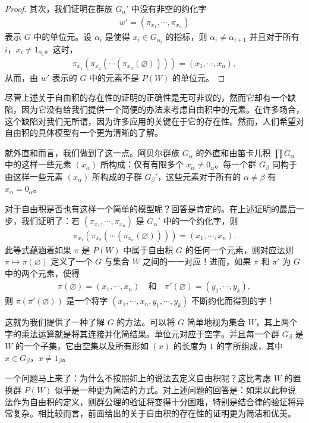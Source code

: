 \documentclass[../../main.tex]{subfiles}
\begin{document}
\begin{proof}
其次，我们证明在群族 $G_\alpha'$ 中没有非空的约化字
\begin{align*}
w'=(\pi_{x_1},\cdots,\pi_{x_n})
\end{align*}
表示 $G$ 中的单位元。设 $\alpha_i$ 是使得 $x_i\in G_{\alpha_i}$ 的指标，则 $\alpha_i\neq\alpha_{i+1}$ 并且对于所有 $i$，$x_i\neq 1_{\alpha_i}$。这时，
\begin{align*}
\pi_{x_1}(\pi_{x_2}(\cdots(\pi_{x_n}(\varnothing))))=(x_1,\cdots,x_n),
\end{align*}
从而，由 $w'$ 表示的 $G$ 中的元素不是 $P(W)$ 的单位元。
\end{proof}

尽管上述关于自由积的存在性的证明的正确性是无可非议的，然而它却有一个缺陷，因为它没有给我们提供一个简便的办法来考虑自由积中的元素。在许多场合，这个缺陷对我们无所谓，因为许多应用的关键在于它的存在性。然而，人们希望对自由积的具体模型有一个更为清晰的了解。

就外直和而言，我们做到了这一点。阿贝尔群族 $G_\alpha$ 的外直和由笛卡儿积 $\prod G_\alpha$ 中的这样一些元素 $(x_\alpha)$ 所构成：仅有有限多个 $x_\alpha\neq 0_\alpha$。每一个群 $G_\beta$ 同构于由这样一些元素 $(x_\alpha)$ 所构成的子群 $G_\beta'$，这些元素对于所有的 $\alpha\neq\beta$ 有 $x_\alpha=0_\alpha$。

对于自由积是否也有这样一个简单的模型呢？回答是肯定的。在上述证明的最后一步，我们证明了：若 $(\pi_{x_1},\cdots,\pi_{x_n})$ 是 $G_\alpha'$ 中的一个约化字，则
\begin{align*}
\pi_{x_1}(\pi_{x_2}(\cdots(\pi_{x_n}(\varnothing))))=(x_1,\cdots,x_n).
\end{align*}
此等式蕴涵着如果 $\pi$ 是 $P(W)$ 中属于自由积 $G$ 的任何一个元素，则对应法则 $\pi\mapsto\pi(\varnothing)$ 定义了一个 $G$ 与集合 $W$ 之间的一一对应！进而，如果 $\pi$ 和 $\pi'$ 为 $G$ 中的两个元素，使得
\begin{align*}
\pi(\varnothing)=(x_1,\cdots,x_n)\quad\text{和}\quad\pi'(\varnothing)=(y_1,\cdots,y_k),
\end{align*}
则 $\pi(\pi'(\varnothing))$ 是一个将字 $(x_1,\cdots,x_n,y_1,\cdots,y_k)$ 不断约化而得到的字！

这就为我们提供了一种了解 $G$ 的方法。可以将 $G$ 简单地视为集合 $W$，其上两个字的乘法运算就是将其连接并化简结果。单位元对应于空字。并且每一个群 $G_\beta$ 是 $W$ 的一个子集，它由空集以及所有形如 $(x)$ 的长度为 $1$ 的字所组成，其中 $x\in G_\beta$，$x\neq 1_\beta$。

一个问题马上来了：为什么不按照如上的说法去定义自由积呢？这比考虑 $W$ 的置换群 $P(W)$ 似乎是一种更为简洁的方式。对上述问题的回答是：如果以此种说法作为自由积的定义，则群公理的验证将变得十分困难，特别是结合律的验证将异常复杂。相比较而言，前面给出的关于自由积的存在性的证明更为简洁和优美。
\end{document}
